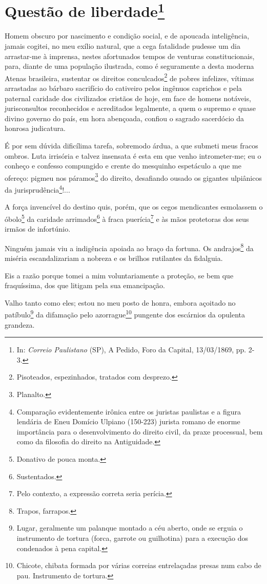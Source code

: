 \chapter{Questão de liberdade\footnote[*]{In: \emph{Correio
  Paulistano} (SP), A Pedido, Foro da Capital, 13/03/1869, pp. 2-3.}}

Homem obscuro por nascimento e condição social, e de apoucada
inteligência, jamais cogitei, no meu exílio natural, que a cega
fatalidade pudesse um dia arrastar-me à imprensa, nestes afortunados
tempos de venturas constitucionais, para, diante de uma população
ilustrada, como é seguramente a desta moderna Atenas brasileira,
sustentar os direitos conculcados\footnote{Pisoteados, espezinhados,
  tratados com desprezo.} de pobres infelizes, vítimas arrastadas ao
bárbaro sacrifício do cativeiro pelos ingênuos caprichos e pela paternal
caridade dos civilizados cristãos de hoje, em face de homens notáveis,
jurisconsultos reconhecidos e acreditados legalmente, a quem o supremo e
quase divino governo do país, em hora abençoada, confiou o sagrado
sacerdócio da honrosa judicatura.

É por sem dúvida dificílima tarefa, sobremodo árdua, a que submeti meus
fracos ombros. Luta irrisória e talvez insensata é esta em que venho
intrometer-me; eu o conheço e confesso compungido e crente do mesquinho
espetáculo a que me ofereço: pigmeu nos páramos\footnote{Planalto.} do
direito, desafiando ousado os gigantes ulpiânicos da
jurisprudência\footnote{Comparação evidentemente irônica entre os
  juristas paulistas e a figura lendária de Eneu Domício Ulpiano
  (150-223) jurista romano de enorme importância para o desenvolvimento
  do direito civil, da praxe processual, bem como da filosofia do
  direito na Antiguidade.}!...

A força invencível do destino quis, porém, que os cegos mendicantes
esmolassem o óbolo\footnote{Donativo de pouca monta.} da caridade
arrimados\footnote{Sustentados.} à fraca puerícia\footnote{Pelo
  contexto, a expressão correta seria perícia.} e às mãos protetoras dos
seus irmãos de infortúnio.

Ninguém jamais viu a indigência apoiada ao braço da fortuna. Os
andrajos\footnote{Trapos, farrapos.} da miséria escandalizariam a
nobreza e os brilhos rutilantes da fidalguia.

Eis a razão porque tomei a mim voluntariamente a proteção, se bem que
fraquíssima, dos que litigam pela sua emancipação.

Valho tanto como eles; estou no meu posto de honra, embora açoitado no
patíbulo\footnote{Lugar, geralmente um palanque montado a céu aberto,
  onde se erguia o instrumento de tortura (forca, garrote ou guilhotina)
  para a execução dos condenados à pena capital.} da difamação pelo
azorrague\footnote{Chicote, chibata formada por várias correias
  entrelaçadas presas num cabo de pau. Instrumento de tortura.} pungente
dos escárnios da opulenta grandeza.

